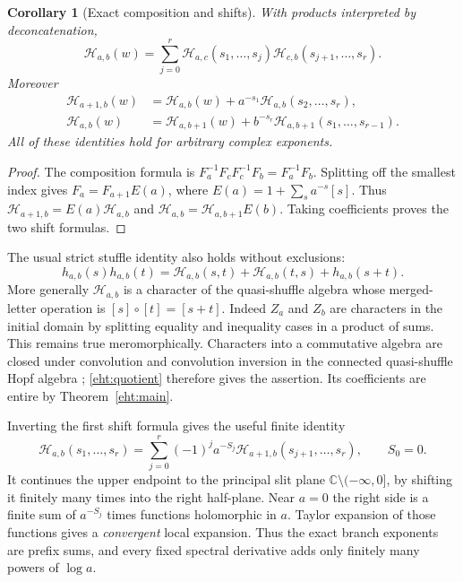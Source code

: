 \documentclass[11pt]{article}
\numberwithin{equation}{section}
\theoremstyle{plain}
\newtheorem{corollary}[theorem]{Corollary}
\theoremstyle{definition}
\theoremstyle{remark}
\begin{document}
\begin{corollary}[Exact composition and shifts]\label{eht:transport}
With products interpreted by deconcatenation,
\begin{equation}\label{eht:cocycle}
 \boxed{\mathcal H_{a,b}(w)=
 \sum_{j=0}^r\mathcal H_{a,c}(s_1,\ldots,s_j)
                  \mathcal H_{c,b}(s_{j+1},\ldots,s_r).}
\end{equation}
Moreover
\begin{align}
 \mathcal H_{a+1,b}(w)
   &=\mathcal H_{a,b}(w)+a^{-s_1}
                              \mathcal H_{a,b}(s_2,\ldots,s_r),
       \label{eht:upper-shift}\\
 \mathcal H_{a,b}(w)
   &=\mathcal H_{a,b+1}(w)+b^{-s_r}
                              \mathcal H_{a,b+1}(s_1,\ldots,s_{r-1}).
       \label{eht:lower-shift}
\end{align}
All of these identities hold for arbitrary complex exponents.
\end{corollary}

\begin{proof}
The composition formula is
$F_a^{-1}F_cF_c^{-1}F_b=F_a^{-1}F_b$.
Splitting off the smallest index gives
$F_a=F_{a+1}E(a)$, where $E(a)=1+\sum_s a^{-s}[s]$.
Thus $\mathcal H_{a+1,b}=E(a)\mathcal H_{a,b}$ and
$\mathcal H_{a,b}=\mathcal H_{a,b+1}E(b)$.  Taking coefficients proves
the two shift formulas.
\end{proof}

The usual strict stuffle identity also holds without exclusions:
\begin{equation}\label{eht:stuffle-two}
 h_{a,b}(s)h_{a,b}(t)=
 \mathcal H_{a,b}(s,t)+\mathcal H_{a,b}(t,s)+h_{a,b}(s+t).
\end{equation}
More generally $\mathcal H_{a,b}$ is a character of the quasi-shuffle
algebra whose merged-letter operation is $[s]\circ[t]=[s+t]$.  Indeed $Z_a$ and
$Z_b$ are characters in the initial domain by splitting equality and
inequality cases in a product of sums.  This remains true meromorphically.
Characters into a commutative algebra are closed under convolution and
convolution inversion in the connected quasi-shuffle Hopf algebra
\cite{eht:Hoffman}; \eqref{eht:quotient} therefore gives the assertion.
Its coefficients are entire by Theorem~\ref{eht:main}.

Inverting the first shift formula gives the useful finite identity
\begin{equation}\label{eht:inverse-shift}
 \boxed{\mathcal H_{a,b}(s_1,\ldots,s_r)=
  \sum_{j=0}^r(-1)^j a^{-S_j}
                  \mathcal H_{a+1,b}(s_{j+1},\ldots,s_r),}
 \qquad S_0=0.
\end{equation}
It continues the upper endpoint to the principal slit plane
$\mathbb C\setminus(-\infty,0]$, by shifting it finitely many times into
the right half-plane.  Near $a=0$ the right side is a finite sum of
$a^{-S_j}$ times functions holomorphic in $a$.  Taylor expansion of those
functions gives a \emph{convergent} local expansion.  Thus the exact
branch exponents are prefix sums, and every fixed spectral derivative
adds only finitely many powers of $\log a$.
\end{document}
